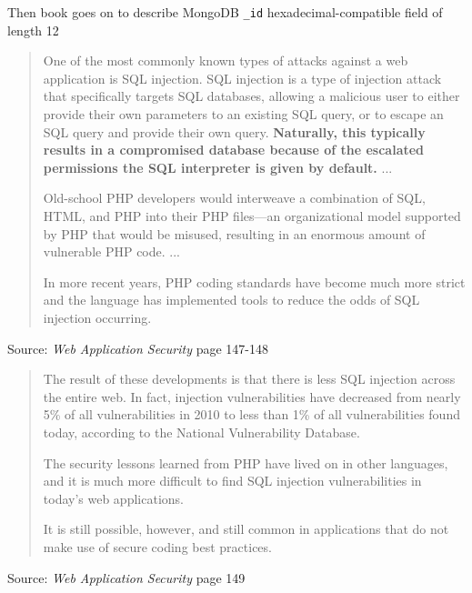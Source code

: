 \documentclass[Screen16to9,17pt]{foils}
\begin{document}
\begin{list2}
\item Then book goes on to describe MongoDB \verb+_id+ hexadecimal-compatible field of length 12
\end{list2}






\begin{quote}
One of the most commonly known types of attacks against a web application is SQL injection. SQL injection is a type of injection attack that specifically targets SQL databases, allowing a malicious user to either provide their own parameters to an existing SQL query, or to escape an SQL query and provide their own query. {\bf Naturally, this typically results in a compromised database because of the escalated permissions the SQL interpreter is given by default.}
...

Old-school PHP developers would interweave a combination of
SQL, HTML, and PHP into their PHP files—an organizational model supported by
PHP that would be misused, resulting in an enormous amount of vulnerable PHP
code.
...

In more recent years, PHP coding standards have become much more strict and the
language has implemented tools to reduce the odds of SQL injection occurring.
\end{quote}
Source: \emph{Web Application Security} page 147-148






\begin{quote}
The result of these developments is that there is less SQL injection across the entire web. In fact, injection vulnerabilities have decreased from nearly 5\% of all vulnerabilities in 2010 to less than 1\% of all vulnerabilities found today, according to the National Vulnerability Database.

The security lessons learned from PHP have lived on in other languages, and it is much more difficult to find SQL injection vulnerabilities in today’s web applications.

It is still possible, however, and still common in applications that do not make use of secure coding best practices.
\end{quote}
Source: \emph{Web Application Security} page 149
\end{document}
